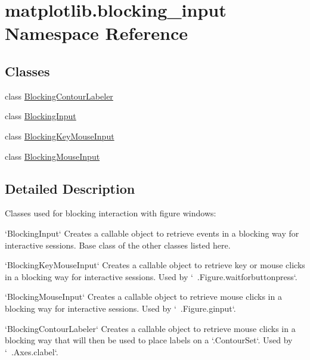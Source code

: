 \hypertarget{namespacematplotlib_1_1blocking__input}{}\section{matplotlib.\+blocking\+\_\+input Namespace Reference}
\label{namespacematplotlib_1_1blocking__input}
\subsection*{Classes}
\begin{DoxyCompactItemize}
\item 
class \hyperlink{classmatplotlib_1_1blocking__input_1_1BlockingContourLabeler}{Blocking\+Contour\+Labeler}
\item 
class \hyperlink{classmatplotlib_1_1blocking__input_1_1BlockingInput}{Blocking\+Input}
\item 
class \hyperlink{classmatplotlib_1_1blocking__input_1_1BlockingKeyMouseInput}{Blocking\+Key\+Mouse\+Input}
\item 
class \hyperlink{classmatplotlib_1_1blocking__input_1_1BlockingMouseInput}{Blocking\+Mouse\+Input}
\end{DoxyCompactItemize}


\subsection{Detailed Description}
\begin{DoxyVerb}Classes used for blocking interaction with figure windows:

`BlockingInput`
    Creates a callable object to retrieve events in a blocking way for
    interactive sessions.  Base class of the other classes listed here.

`BlockingKeyMouseInput`
    Creates a callable object to retrieve key or mouse clicks in a blocking
    way for interactive sessions.  Used by `~.Figure.waitforbuttonpress`.

`BlockingMouseInput`
    Creates a callable object to retrieve mouse clicks in a blocking way for
    interactive sessions.  Used by `~.Figure.ginput`.

`BlockingContourLabeler`
    Creates a callable object to retrieve mouse clicks in a blocking way that
    will then be used to place labels on a `.ContourSet`.  Used by
    `~.Axes.clabel`.
\end{DoxyVerb}
 
